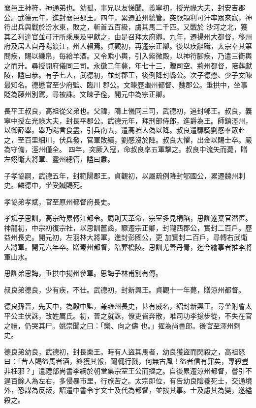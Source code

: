 \begin{pinyinscope}
 襄邑王神符，神通弟也。幼孤，事兄以友悌聞。義寧初，授光祿大夫，封安吉郡公。武德元年，進封襄邑郡王。四年，累遷並州總管。突厥頡利可汗率眾來寇，神符出兵與戰於汾水東，敗之，斬首五百級，虜其馬二千匹。又戰於
 沙河之北，獲其乙利達官並可汗所乘馬及甲獻之，由是召拜太府卿。九年，遷揚州大都督，移州府及居人自丹陽渡江，州人賴焉。貞觀初，再遷宗正卿。後以疾辭職，太宗幸其第問疾，賜以縑帛，每給羊酒。又令乘小輿，引入紫微殿，以神符腳疾，乃遣三衛輿之而升。尋授開府儀同三司。永徽二年薨，年七十三，贈司空、荊州都督，陪葬獻陵，謚曰恭。有子七人，武德初，並封郡王，後例降封縣公。次子德懋、少子文暕最知名。德懋官至少府監、臨川
 郡公。文暕歷幽州都督、魏郡公。垂拱中，坐事貶為藤州別駕，尋被誅。文暕子佺，開元中為宗正卿。



 長平王叔良，高祖從父弟也。父禕，隋上儀同三司，武德初，追封郇王。叔良，義寧中授左光祿大夫，封長平郡公。武德元年，拜刑部侍郎，進爵為王。師鎮涇州，以御薛舉。舉乃陽言食盡，引兵南去，遣高墌人偽以降。叔良遣驃騎劉感率眾赴之，至百里細川，伏兵發，官軍敗績，劉感沒於陣。叔良大懼，出金以賜士卒。嚴為守備，涇州僅全。
 四年，突厥入寇，命叔良率五軍擊之。叔良中流矢而薨，贈左翊衛大將軍、靈州總管，謚曰肅。



 子孝協嗣，武德五年，封範陽郡王。貞觀初，以屬疏例降封郇國公，累遷魏州刺史。麟德中，坐受贓賜死。



 孝協弟孝斌，官至原州都督府長史。



 孝斌子思訓，高宗時累轉江都令。屬則天革命，宗室多見構陷，思訓遂棄官潛匿。神龍初，中宗初復宗社，以思訓舊齒，驟遷宗正卿，封隴西郡公，實封二百戶。歷益州長史。開元初，左羽林大將軍，進封彭國公，更
 加實封二百戶，尋轉右武衛大將軍。開元六年卒。贈秦州都督，陪葬橋陵。思訓尤善丹青，迄今繪事者推李將軍山水。



 思訓弟思誨，垂拱中揚州參軍。思誨子林甫別有傳。



 叔良弟德良，少有疾，不仕。武德初，封新興王。貞觀十一年薨，贈涼州都督。



 德良孫晉，先天中，為殿中監，兼雍州長史，甚有威名，紹封新興王。尋坐附會太平公主伏誅，改姓厲氏。初，晉之就誅，僚吏皆奔散，唯司功李捴步從，不失在官之禮，仍哭其尸。姚崇聞之曰：「欒、向之儔
 也。」擢為尚書郎。後官至澤州刺史。



 德良弟幼良，武德初，封長樂王。時有人盜其馬者，幼良獲盜而閃殺之，高祖怒曰：「昔人賜盜馬者酒，終獲其報，爾輒行戮，何無古風！盜者信有罪矣，專殺豈非枉邪？」遣禮部尚書李綱於朝堂集宗室王公而撻之。自後累遷涼州都督，嘗引不逞百餘人為左右，多侵暴市里，行旅苦之。太宗即位，有告幼良陰養死士，交通境外，恐謀為反叛，詔遣中書令宇文士及代為都督，並按其事。士及慮其為變，遂縊殺之。




\end{pinyinscope}
